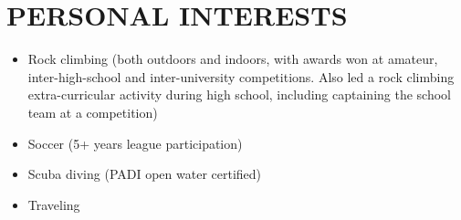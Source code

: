 \documentclass[a4paper,10pt]{extarticle}
\begin{document}
\section*{PERSONAL INTERESTS}
\begin{itemize}
    \item Rock climbing (both outdoors and indoors, with awards won at amateur, inter-high-school and inter-university competitions. Also led a rock climbing extra-curricular activity during high school, including captaining the school team at a competition)

    \item Soccer (5+ years league participation)

    \item Scuba diving (PADI open water certified)

    \item Traveling
\end{itemize}







\end{document}
